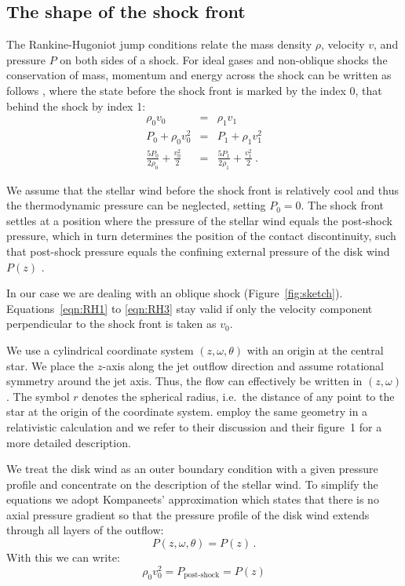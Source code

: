 \documentclass{emulateapj}
\begin{document}
\subsection{The shape of the shock front}
\label{sect:model}
The Rankine-Hugoniot jump conditions relate the mass density $\rho$, velocity $v$, and pressure $P$ on both sides of a shock. For ideal gases and non-oblique shocks the conservation of mass, momentum and energy across the shock can be written as follows \citep[][chap.~7]{1967pswh.book.....Z}, where the state before the shock front is marked by the index 0, that behind the shock by index 1:
\begin{eqnarray}
\rho_0 v_0 & = & \rho_1 v_1 \label{eqn:RH1}\\
\label{eqn:RH2}P_0+\rho_0 v_0^2 & = & P_1+\rho_1 v_1^2\\
\label{eqn:RH3}\frac{5 P_0}{2\rho_0}+\frac{v_0^2}{2}& = &\frac{5 P_1}{2\rho_1}+\frac{v_1^2}{2} \ .
\end{eqnarray}

We assume that the stellar wind before the shock front is relatively cool and thus the thermodynamic pressure can be neglected, setting $P_0=0$.
The shock front settles at a position where the pressure of the stellar wind equals the post-shock pressure, which in turn determines the position of the contact discontinuity, such that post-shock pressure equals the confining external pressure of the disk wind $P(z)$ . 

In our case we are dealing with an oblique shock (Figure~\ref{fig:sketch}). Equations~\ref{eqn:RH1} to \ref{eqn:RH3} stay valid if only the velocity component perpendicular to the shock front is taken as $v_0$. 

We use a cylindrical coordinate system $(z, \omega, \theta)$ with an origin at the central star. We place the $z$-axis along the jet outflow direction and assume rotational symmetry around the jet axis. Thus, the flow can effectively be written in $(z,\omega)$. The symbol $r$ denotes the spherical radius, i.e.\ the distance of any point to the star at the origin of the coordinate system. 
\citet{2012MNRAS.422.2282K} employ the same geometry in a relativistic calculation and we refer to their discussion and their figure~1 for a more detailed description.

We treat the disk wind as an outer boundary condition with a given pressure profile and concentrate on the description of the stellar wind. To simplify the equations we adopt Kompaneets' approximation \citep{1960SPhD....5...46K} which states that there is no axial pressure gradient so that the pressure profile of the disk wind extends through all layers of the outflow:
\begin{equation}
P(z, \omega, \theta) = P(z)\,.
\end{equation}
With this we can write:
\begin{equation}\label{eqn:Pofz}
\rho_0 v_0^2 = P_{\textrm{post-shock}} = P(z)
\end{equation}
\end{document}
